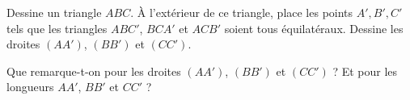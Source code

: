 Dessine un triangle $ABC$. \`A l'extérieur de ce triangle, place les
 points $A', B',C'$ tels que les triangles $ABC'$, $BCA'$ et $ACB'$
 soient tous équilatéraux. Dessine les droites $(AA')$, $(BB')$ et
 $(CC')$.
\par Que remarque-t-on pour les droites $(AA')$, $(BB')$ et $(CC')$ ?
Et pour les longueurs $AA'$, $BB'$ et $CC'$ ?